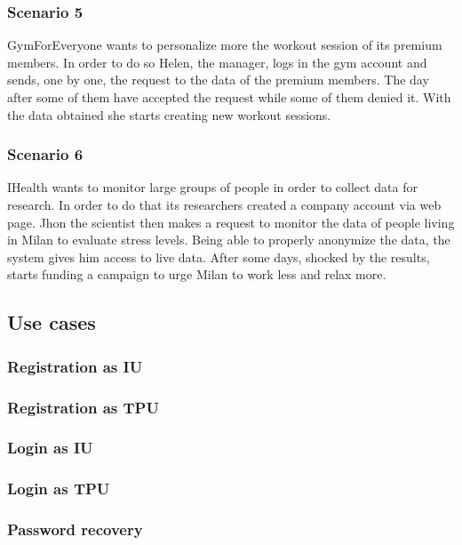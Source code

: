 \subsubsection{Scenario 5}
GymForEveryone wants to personalize more the workout session of its premium members. In order to do so Helen, the manager, logs in the gym account and sends, one by one, the request to the data of the premium members. The day after some of them have accepted the request while some of them denied it. With the data obtained she starts creating new workout sessions.
\subsubsection{Scenario 6}
IHealth wants to monitor large groups of people in order to collect data for research. In order to do that its researchers created a company account via web page. Jhon the scientist then makes a request to monitor the data of people living in Milan to evaluate stress levels. Being able to properly anonymize the data, the system gives him access to live data. After some days, shocked by the results, starts funding a campaign to urge Milan to work less and relax more.
\clearpage


\subsection{Use cases}
\subsubsection{Registration as IU}

\clearpage
\subsubsection{Registration as TPU}

\clearpage
\subsubsection{Login as IU}

\clearpage
\subsubsection{Login as TPU}

\clearpage
\subsubsection{Password recovery}

\clearpage
